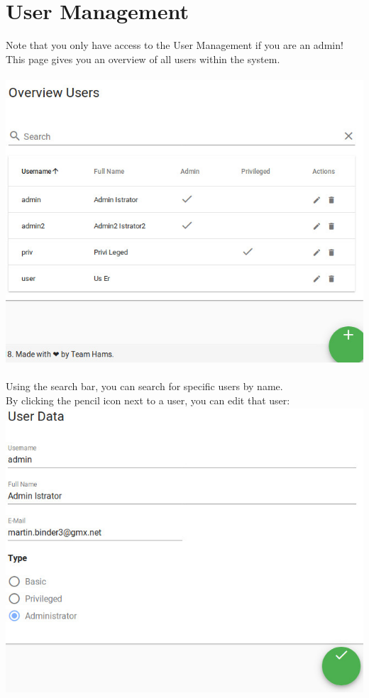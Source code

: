 \documentclass[twoside,a4paper]{refart}
\begin{document}
\section{User Management}
Note that you only have access to the User Management if you are an admin! \\ 
This page gives you an overview of all users within the system. \\ \\
\includegraphics[width=\linewidth]{useroverview.jpeg} \\ \\
Using the search bar, you can search for specific users by name.\\
By clicking the pencil icon next to a user, you can edit that user: \\
\includegraphics[width=\linewidth]{useredit.jpeg} \\ \\
\end{document}
